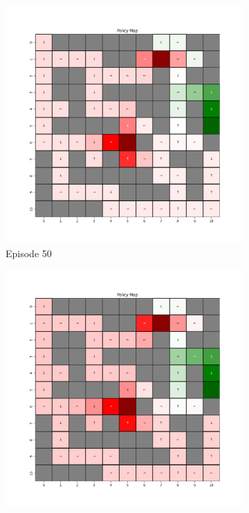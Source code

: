 \documentclass{assignment}
\begin{document}
\begin{figure}[H]
\begin{subfigure}{0.3\textwidth}
        \includegraphics[width=\textwidth]{figures/policy_td/epsilon_sweep/policy_alpha_0.1_gamma_0.95_epsilon_0.5_iteration_50.png}
    \caption{Episode 50}
    \end{subfigure}\hfill
    \begin{subfigure}{0.3\textwidth}
        \includegraphics[width=\textwidth]{figures/policy_td/epsilon_sweep/policy_alpha_0.1_gamma_0.95_epsilon_0.5_iteration_100.png}

\end{subfigure}
\end{figure}
\end{document}
